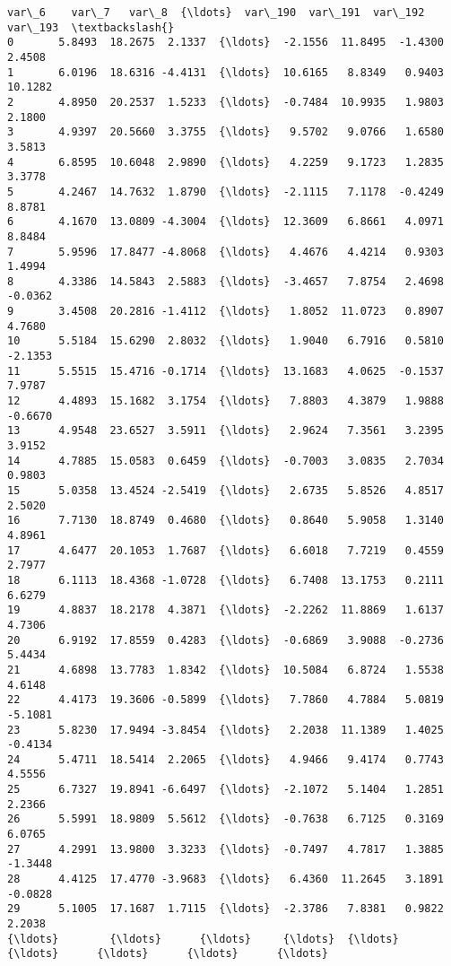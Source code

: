 \documentclass[11pt]{article}
\begin{document}
\begin{Verbatim}[commandchars=\\\{\}]
         var\_6    var\_7   var\_8  {\ldots}  var\_190  var\_191  var\_192  var\_193  \textbackslash{}
0       5.8493  18.2675  2.1337  {\ldots}  -2.1556  11.8495  -1.4300   2.4508   
1       6.0196  18.6316 -4.4131  {\ldots}  10.6165   8.8349   0.9403  10.1282   
2       4.8950  20.2537  1.5233  {\ldots}  -0.7484  10.9935   1.9803   2.1800   
3       4.9397  20.5660  3.3755  {\ldots}   9.5702   9.0766   1.6580   3.5813   
4       6.8595  10.6048  2.9890  {\ldots}   4.2259   9.1723   1.2835   3.3778   
5       4.2467  14.7632  1.8790  {\ldots}  -2.1115   7.1178  -0.4249   8.8781   
6       4.1670  13.0809 -4.3004  {\ldots}  12.3609   6.8661   4.0971   8.8484   
7       5.9596  17.8477 -4.8068  {\ldots}   4.4676   4.4214   0.9303   1.4994   
8       4.3386  14.5843  2.5883  {\ldots}  -3.4657   7.8754   2.4698  -0.0362   
9       3.4508  20.2816 -1.4112  {\ldots}   1.8052  11.0723   0.8907   4.7680   
10      5.5184  15.6290  2.8032  {\ldots}   1.9040   6.7916   0.5810  -2.1353   
11      5.5515  15.4716 -0.1714  {\ldots}  13.1683   4.0625  -0.1537   7.9787   
12      4.4893  15.1682  3.1754  {\ldots}   7.8803   4.3879   1.9888  -0.6670   
13      4.9548  23.6527  3.5911  {\ldots}   2.9624   7.3561   3.2395   3.9152   
14      4.7885  15.0583  0.6459  {\ldots}  -0.7003   3.0835   2.7034   0.9803   
15      5.0358  13.4524 -2.5419  {\ldots}   2.6735   5.8526   4.8517   2.5020   
16      7.7130  18.8749  0.4680  {\ldots}   0.8640   5.9058   1.3140   4.8961   
17      4.6477  20.1053  1.7687  {\ldots}   6.6018   7.7219   0.4559   2.7977   
18      6.1113  18.4368 -1.0728  {\ldots}   6.7408  13.1753   0.2111   6.6279   
19      4.8837  18.2178  4.3871  {\ldots}  -2.2262  11.8869   1.6137   4.7306   
20      6.9192  17.8559  0.4283  {\ldots}  -0.6869   3.9088  -0.2736   5.4434   
21      4.6898  13.7783  1.8342  {\ldots}  10.5084   6.8724   1.5538   4.6148   
22      4.4173  19.3606 -0.5899  {\ldots}   7.7860   4.7884   5.0819  -5.1081   
23      5.8230  17.9494 -3.8454  {\ldots}   2.2038  11.1389   1.4025  -0.4134   
24      5.4711  18.5414  2.2065  {\ldots}   4.9466   9.4174   0.7743   4.5556   
25      6.7327  19.8941 -6.6497  {\ldots}  -2.1072   5.1404   1.2851   2.2366   
26      5.5991  18.9809  5.5612  {\ldots}  -0.7638   6.7125   0.3169   6.0765   
27      4.2991  13.9800  3.3233  {\ldots}  -0.7497   4.7817   1.3885  -1.3448   
28      4.4125  17.4770 -3.9683  {\ldots}   6.4360  11.2645   3.1891  -0.0828   
29      5.1005  17.1687  1.7115  {\ldots}  -2.3786   7.8381   0.9822   2.2038   
{\ldots}        {\ldots}      {\ldots}     {\ldots}  {\ldots}      {\ldots}      {\ldots}      {\ldots}      {\ldots}   

\end{Verbatim}
\end{document}
